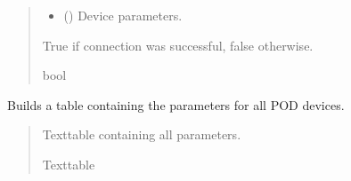 \documentclass[letterpaper,10pt,english]{sphinxmanual}
\begin{document}
\begin{fulllineitems}
\begin{fulllineitems}
\begin{quote}
\begin{description}
\begin{itemize}
\item {} 
\sphinxAtStartPar
{} () \textendash{} Device parameters.

\end{itemize}

\sphinxAtStartPar
True if connection was successful, false otherwise.

\sphinxAtStartPar
bool

\end{description}\end{quote}

\end{fulllineitems}


\begin{fulllineitems}
\label{\detokenize{Setup.SetupOneDevice:Setup.SetupOneDevice.Setup_8401HR.Setup8401HR._GetPODdeviceParameterTable}}
\pysigstartsignatures
{}
\pysigstopsignatures
\sphinxAtStartPar
Builds a table containing the parameters for all POD devices.
\begin{quote}\begin{description}
\sphinxAtStartPar
Texttable containing all parameters.

\sphinxAtStartPar
Texttable

\end{description}\end{quote}

\end{fulllineitems}



\end{fulllineitems}
\end{document}

